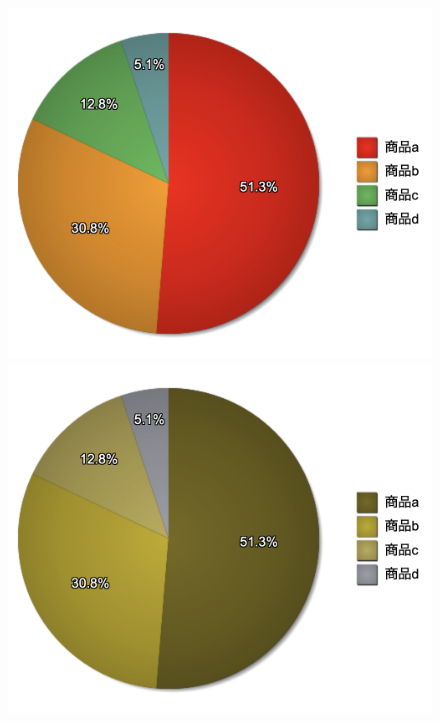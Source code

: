 \begin{figure}[H]
    \centering
    \begin{minipage}[b]{.23\textwidth}
        \centering
        \includegraphics[keepaspectratio,width=\textwidth]{../../10_UniversalDesign/no2_circle_original.png}
    \end{minipage}
    \begin{minipage}[b]{.23\textwidth}
        \centering
        \includegraphics[keepaspectratio,width=\textwidth]{../../10_UniversalDesign/no2_circle_CC_P.png}

\end{minipage}
\end{figure}
